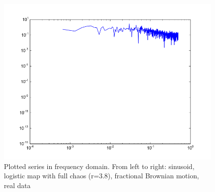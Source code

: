 \documentclass[12pt]{article}
\begin{document}
\begin{figure}
\begin{center}
    \includegraphics[scale=0.4]{spectrum_vr}
  \end{center}
  \caption{Plotted series in frequency domain. From left to right: sinusoid, logistic map with full chaos (r=3.8), fractional Brownian motion, real data}
\end{figure}
\end{document}
